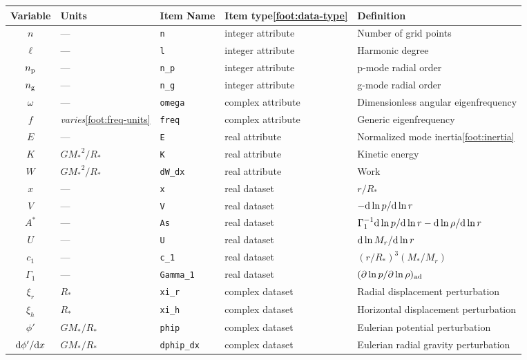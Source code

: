 \documentclass{article}
\newcommand{\diff}{\ensuremath{{\rm d}}}
\newcommand{\Rstar}{\ensuremath{R_{\ast}}}
\newcommand{\Mstar}{\ensuremath{M_{\ast}}}
\begin{document}
\begin{landscape}
\begin{center}
\begin{longtable}{cllll} \hline
Variable & Units & Item Name & Item type\cref{foot:data-type} & Definition \\ \hline
$n$ & --- & \texttt{n} & integer attribute & Number of grid points \\
$\ell$ & --- & \texttt{l} & integer attribute & Harmonic degree \\
$n_{\rm p}$ & --- & \texttt{n\_p} & integer attribute & p-mode radial order \\
$n_{\rm g}$ & --- & \texttt{n\_g} & integer attribute & g-mode radial order \\
$\omega$ & ---   & \texttt{omega} & complex attribute & Dimensionless angular eigenfrequency \\
$f$      & \emph{varies}\cref{foot:freq-units} & \texttt{freq} & complex attribute & Generic eigenfrequency \\
$E$ & --- & \texttt{E} & real attribute & Normalized mode inertia\cref{foot:inertia} \\
$K$ & $G\Mstar^{2}/\Rstar$ & \texttt{K} & real attribute & Kinetic energy \\ 
$W$ & $G\Mstar^{2}/\Rstar$ & \texttt{dW\_dx} & real attribute & Work \\
$x$ & --- & \texttt{x} & real dataset & $r/\Rstar$ \\
$V$ & --- & \texttt{V} & real dataset & $-\diff \ln p/\diff \ln r$ \\
$A^{\ast}$ & --- & \texttt{As} & real dataset & $\Gamma_{1}^{-1} \diff \ln p/\diff \ln r - \diff \ln \rho/\diff \ln r$ \\
$U$ & --- & \texttt{U} & real dataset & $\diff \ln M_{r}/\diff \ln r$ \\
$c_{1}$ & --- & \texttt{c\_1} & real dataset & $(r/\Rstar)^{3} (\Mstar/M_{r})$ \\
$\Gamma_{1}$ & --- & \texttt{Gamma\_1} & real dataset & $(\partial \ln p/\partial \ln \rho)_{\rm ad}$ \\
$\xi_{r}$ & \Rstar & \texttt{xi\_r} & complex dataset & Radial displacement perturbation \\
$\xi_{h}$ & \Rstar & \texttt{xi\_h} & complex dataset & Horizontal displacement perturbation \\
$\phi'$ & $G\Mstar/\Rstar$ & \texttt{phip} & complex dataset & Eulerian potential perturbation \\
$\diff\phi'/\diff x$ & $G\Mstar/\Rstar$ & \texttt{dphip\_dx} & complex dataset & Eulerian radial gravity perturbation \\

\end{longtable}
\end{center}
\end{landscape}
\end{document}
